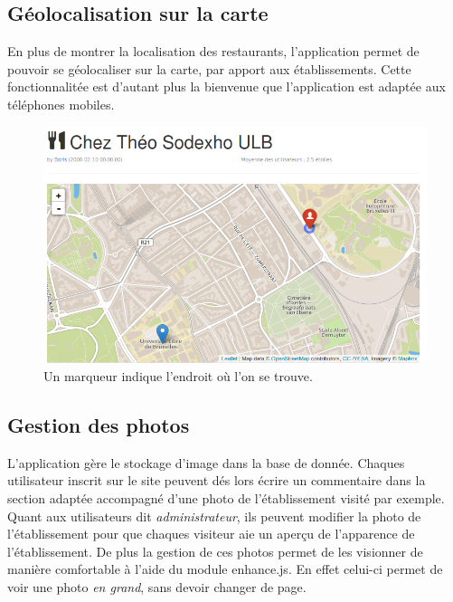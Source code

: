 \documentclass[a4paper,10pt]{article}
\begin{document}
\subsection{Géolocalisation sur la carte}
    En plus de montrer la localisation des restaurants, l'application permet
    de pouvoir se géolocaliser sur la carte, par apport aux établissements.
    \newline
    Cette fonctionnalitée est d'autant plus la bienvenue que l'application est
    adaptée aux téléphones mobiles.

    \begin{figure}[h]
        \centering
        \includegraphics[scale=0.4]{./images/geolocalisation.png}
        \caption{Un marqueur indique l'endroit où l'on se trouve.}
    \end{figure}


\subsection{Gestion des photos}
    L'application gère le stockage d'image dans la base de donnée.
    Chaques utilisateur inscrit sur le site peuvent dés lors écrire un
    commentaire dans la section adaptée accompagné d'une photo de
    l'établissement visité par exemple. \newline
    Quant aux utilisateurs dit \emph{administrateur}, ils peuvent modifier
    la photo de l'établissement pour que chaques visiteur aie un aperçu de
    l'apparence de l'établissement. \newline
    De plus la gestion de ces photos permet de les visionner de manière
    comfortable à l'aide du module enhance.js. En effet celui-ci permet de voir
    une photo \emph{en grand}, sans devoir changer de page.
\end{document}
